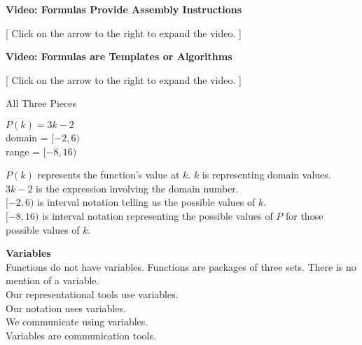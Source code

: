 \documentclass{ximera}
\begin{document}
\begin{explanation} \textbf{Video: Formulas Provide Assembly Instructions}

[ Click on the arrow to the right to expand the video. ]
\begin{expandable} 

\begin{center}
\end{center}

\end{expandable}
\end{explanation}




\begin{explanation} \textbf{Video: Formulas are Templates or Algorithms}

[ Click on the arrow to the right to expand the video. ]
\begin{expandable} 

\begin{center}
\end{center}

\end{expandable}
\end{explanation}








\begin{example}   All Three Pieces 

$P(k) = 3k - 2$ \\
domain = $[-2, 6)$ \\
range = $[-8, 16)$


$P(k)$ represents the function's value at $k$.  $k$ is representing domain values. $3k - 2$ is the expression involving the domain number. \\

$[-2, 6)$ is interval notation telling us the possible values of $k$. \\

$[-8, 16)$ is interval notation representing the possible values of $P$ for those possible values of $k$.  


\end{example}




\begin{warning} \textbf{\textcolor{red!90!darkgray}{Variables}}    \\

Functions do not have variables.  Functions are packages of three sets.  There is no mention of a variable. \\

Our representational tools use variables. \\

Our notation uses variables. \\

We communicate using variables.  \\

Variables are communication tools. 

\end{warning}
\end{document}
